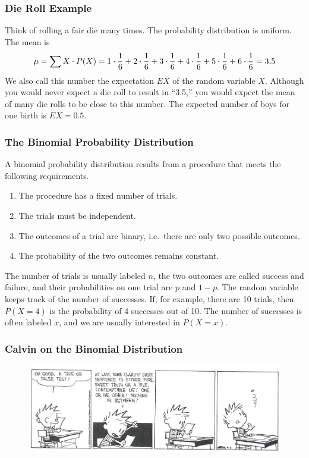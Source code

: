\documentclass[xcolor=dvipsnames]{beamer}
\begin{document}
\begin{frame}
  \frametitle{Die Roll Example}
\label{ex:reinooth} Think of rolling a fair die
many times. The probability distribution is uniform. The mean is
\begin{equation}
  \label{eq:isiamaih}
   \mu=\sum{}X\cdot{}P(X)=1\cdot{}\frac{1}{6}+2\cdot{}\frac{1}{6}+3\cdot{}\frac{1}{6}+4\cdot{}\frac{1}{6}+5\cdot{}\frac{1}{6}+6\cdot{}\frac{1}{6}=3.5\notag
\end{equation}
We also call this number the \alert{expectation} $EX$ of the random
variable $X$. Although you would never expect a die roll to result in
``3.5,'' you would expect the mean of many die rolls to be close to
this number. The expected number of boys for one birth is $EX=0.5$.
\end{frame}

\begin{frame}
  \frametitle{The Binomial Probability Distribution}
A \alert{binomial probability distribution} results from a procedure
that meets the following requirements.
\begin{enumerate}
\item The procedure has a fixed number of trials.
\item The trials must be independent.
\item The outcomes of a trial are binary, i.e.\ there are only two
  possible outcomes.
\item The probability of the two outcomes remains constant.
\end{enumerate}
The number of trials is usually labeled $n$, the two outcomes are
called \alert{success} and \alert{failure}, and their probabilities on
one trial are $p$ and $1-p$. The random variable keeps track of the
number of successes. If, for example, there are 10 trials, then
$P(X=4)$ is the probability of 4 successes out of 10. The number of
successes is often labeled $x$, and we are usually interested in
$P(X=x)$.
\end{frame}

\begin{frame}
  \frametitle{Calvin on the Binomial Distribution}
\begin{figure}[h]
\includegraphics[scale=.43]{./diagrams/calvin_hobbes_binomial_edited.jpg}
\end{figure}
\end{frame}
\end{document}
